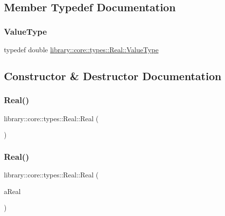 \subsection{Member Typedef Documentation}
\mbox{\label{classlibrary_1_1core_1_1types_1_1_real_a9c5c8826b7e5a8e39544d23fea6c0e1c}} 
\subsubsection{\texorpdfstring{ValueType}{ValueType}}
{\footnotesize\ttfamily typedef double \mbox{\hyperlink{classlibrary_1_1core_1_1types_1_1_real_a9c5c8826b7e5a8e39544d23fea6c0e1c}{library\+::core\+::types\+::\+Real\+::\+Value\+Type}}}



\subsection{Constructor \& Destructor Documentation}
\mbox{\label{classlibrary_1_1core_1_1types_1_1_real_a664a212a24c7016016a27cf2320a94c1}} 
\subsubsection{\texorpdfstring{Real()}{Real()}\hspace{0.1cm}{\footnotesize\ttfamily [1/2]}}
{\footnotesize\ttfamily library\+::core\+::types\+::\+Real\+::\+Real (\begin{DoxyParamCaption}{ }\end{DoxyParamCaption})\hspace{0.3cm}{\ttfamily [delete]}}

\mbox{\label{classlibrary_1_1core_1_1types_1_1_real_ab25a7f4966c2a2b8facf905a441ad5b5}} 
\subsubsection{\texorpdfstring{Real()}{Real()}\hspace{0.1cm}{\footnotesize\ttfamily [2/2]}}
{\footnotesize\ttfamily library\+::core\+::types\+::\+Real\+::\+Real (\begin{DoxyParamCaption}\item[{\mbox{\hyperlink{classlibrary_1_1core_1_1types_1_1_real_a9c5c8826b7e5a8e39544d23fea6c0e1c}{Real\+::\+Value\+Type}}}]{a\+Real }\end{DoxyParamCaption})}



